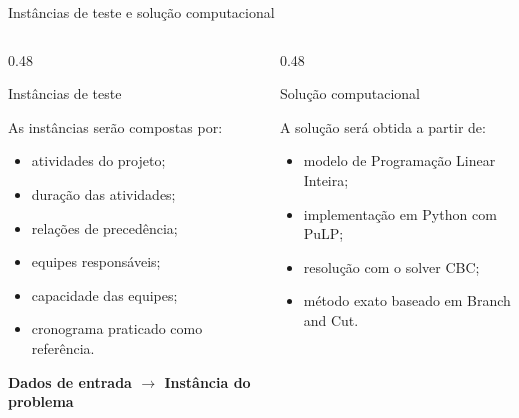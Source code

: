 \documentclass{beamer}
\begin{document}
\begin{frame}{Instâncias de teste e solução computacional}

\scriptsize

\begin{columns}[T,onlytextwidth]

\begin{column}{0.48\textwidth}

    \begin{block}{Instâncias de teste}

        As instâncias serão compostas por:

        \begin{itemize}
            \setlength{\itemsep}{0.08cm}
            \item atividades do projeto;
            \item duração das atividades;
            \item relações de precedência;
            \item equipes responsáveis;
            \item capacidade das equipes;
            \item cronograma praticado como referência.
        \end{itemize}

        \begin{center}
            \textbf{
            Dados de entrada
            \(\rightarrow\)
            Instância do problema
            }
        \end{center}

    \end{block}

\end{column}

\begin{column}{0.48\textwidth}

    \begin{block}{Solução computacional}

        A solução será obtida a partir de:

        \begin{itemize}
            \setlength{\itemsep}{0.08cm}
            \item modelo de Programação Linear Inteira;
            \item implementação em Python com PuLP;
            \item resolução com o solver CBC;
            \item método exato baseado em Branch and Cut.
        \end{itemize}


\end{block}
\end{column}
\end{columns}
\end{frame}
\end{document}
